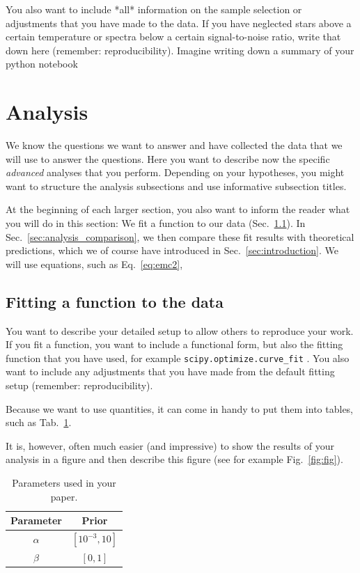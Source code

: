 \documentclass[twocolumn,apj,numberedappendix,appendixfloats]{openjournal}
\begin{document}
You also want to include *all* information on the sample selection or adjustments that you have made to the data. If you have neglected stars above a certain temperature or spectra below a certain signal-to-noise ratio, write that down here (remember: reproducibility). Imagine writing down a summary of your python notebook 

\clearpage
\section{Analysis} \label{sec:analysis}

We know the questions we want to answer and have collected the data that we will use to answer the questions. Here you want to describe now the specific \textit{advanced} analyses that you perform. Depending on your hypotheses, you might want to structure the analysis subsections and use informative subsection titles.

At the beginning of each larger section, you also want to inform the reader what you will do in this section: We fit a function to our data (Sec.~\ref{sec:analysis_fitting}). In Sec.~\ref{sec:analysis_comparison}, we then compare these fit results with theoretical predictions, which we of course have introduced in Sec.~\ref{sec:introduction}. We will use equations, such as Eq.~\ref{eq:emc2}, 

\subsection{Fitting a function to the data} \label{sec:analysis_fitting}

You want to describe your detailed setup to allow others to reproduce your work. If you fit a function, you want to include a functional form, but also the fitting function that you have used, for example \texttt{scipy.optimize.curve\_fit} \citep{Scipy}. You also want to include any adjustments that you have made from the default fitting setup (remember: reproducibility).

Because we want to use quantities, it can come in handy to put them into tables, such as Tab.~\ref{table:table}.

It is, however, often much easier (and impressive) to show the results of your analysis in a figure and then describe this figure (see for example Fig.~\ref{fig:fig}).

\begin{table}
    \centering
    \caption{Parameters used in your paper.}
    \begin{tabular}{ c c }  
        Parameter & Prior \\
        \hline \hline     
        {\boldmath$\alpha$} & $\left[ 10^{-3}, 10 \right]$ \\
        {\boldmath$\beta$} & $\left[ 0, 1 \right]$ \\   
        \hline \hline  
    \end{tabular}  
    \label{table:table}
\end{table}
\end{document}
